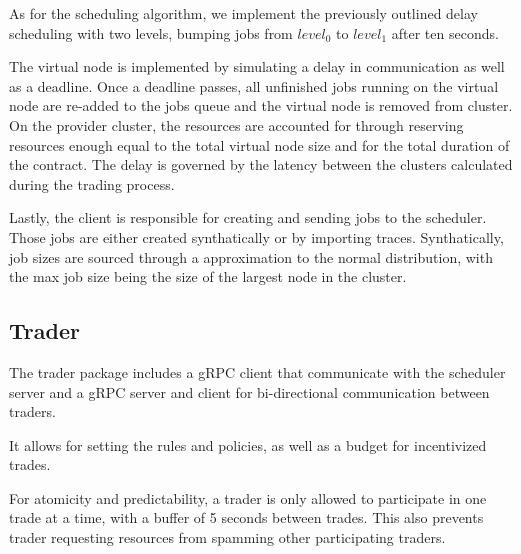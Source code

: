 As for the scheduling algorithm, we implement the previously outlined delay
scheduling with two levels, bumping jobs from $level_0$ to $level_1$ after ten
seconds.

The virtual node is implemented by simulating a delay in communication as well
as a deadline. Once a deadline passes, all unfinished jobs running on the
virtual node are re-added to the jobs queue and the virtual node is removed
from cluster. On the provider cluster, the resources are accounted for through
reserving resources enough equal to the total virtual node size and for the
total duration of the contract. The delay is governed by the latency between
the clusters calculated during the trading process.

Lastly, the client is responsible for creating and sending jobs to the
scheduler. Those jobs are either created synthatically or by importing traces.
Synthatically, job sizes are sourced through a approximation to the normal
distribution, with the max job size being the size of the largest node in the
cluster.

\subsection{Trader}

The trader package includes a gRPC client that communicate with the scheduler
server and a gRPC server and client for bi-directional communication between
traders.

It allows for setting the rules and policies, as well as a budget for
incentivized trades.

For atomicity and predictability, a trader is only allowed to participate in
one trade at a time, with a buffer of 5 seconds between trades. This also
prevents trader requesting resources from spamming other participating traders. 





